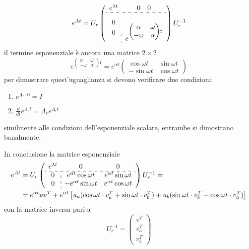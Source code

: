 $$
e^{At} = U_r \left(
\begin{array}{c:c}
e^{\lambda t} & 0 \quad 0 \\ \hdashline
\begin{aligned}
0 \\ 0
\end{aligned} &\begin{aligned} \\ e^{\begin{pmatrix}
\alpha& \omega\\
-\omega & \alpha
\end{pmatrix}t}\end{aligned}
\end{array}
\right) U_r^{-1}
$$
il termine esponenziale è ancora una matrice $2\times 2$
$$
e^{\begin{pmatrix}
\alpha& \omega\\
-\omega & \alpha
\end{pmatrix}t} =
e^{\alpha t} \begin{pmatrix}
\cos \omega t & \sin \omega t \\
-\sin \omega t & \cos \omega t
\end{pmatrix}
$$
per dimostrare quest'uguaglianza si devono verificare due condizioni:
\begin{enumerate}
 \item $e^{\Lambda_r \cdot 0} = I$
 \item $\frac{d}{dt} e^{\Lambda_r t} = \Lambda_re^{\Lambda_r t}$
\end{enumerate}
similmente alle condizioni dell'esponenziale scalare, entrambe si dimostrano
banalmente.

\newpage
In conclusione la matrice esponenziale
$$\begin{aligned}
e^{At} &= U_r \left(\begin{array}{c:cc}
e^{\lambda t} & 0 & 0 \\ \hdashline
0 & e^{\alpha t}\cos\omega t & e^{\alpha t}\sin\omega t \\
0 & -e^{\alpha t}\sin\omega t & e^{\alpha t}\cos\omega t
\end{array}\right)U_r^{-1} = \\
&=e^{\alpha t}uv^T + e^{\alpha t}\left[
u_a(\cos\omega t\cdot v_a^T + \sin\omega t\cdot v_b^T) +
u_b(\sin\omega t\cdot v_b^T - \cos\omega t\cdot v_a^T)
\right]
\end{aligned}$$
con la matrice inversa pari a
$$
U_r^{-1} = \begin{pmatrix}
v^T \\ v_a^T \\ v_b^T
\end{pmatrix}
$$
